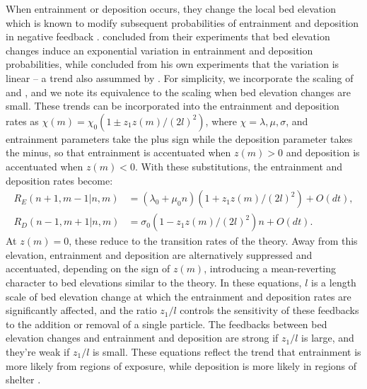 \documentclass[draft]{agujournal2018}
\begin{document}
When entrainment or deposition occurs, they change the local bed elevation which is known to modify subsequent probabilities of entrainment and deposition in negative feedback \citep{Sawai1987, Wong2007}.
\citet{Wong2007} concluded from their experiments that bed elevation changes induce an exponential variation in entrainment and deposition probabilities, while \citet{Sawai1987} concluded from his own experiments that the variation is linear -- a trend also assummed by \citet{Martin2014}.
For simplicity, we incorporate the scaling of \citet{Sawai1987} and \citet{Martin2014}, and we note its equivalence to the \citet{Wong2007} scaling when bed elevation changes are small.
These trends can be incorporated into the entrainment and deposition rates as $\chi(m) = \chi_0(1\pm z_1 z(m)/(2l)^2)$, where $\chi = \lambda, \mu, \sigma$, and entrainment parameters take the plus sign while the deposition parameter takes the minus, so that entrainment is accentuated when $z(m)>0$ and deposition is accentuated when $z(m)<0$. 
With these substitutions, the entrainment and deposition rates become:
\begin{align}
R_E(n+1,m-1| n,m)  &= (\lambda_0 + \mu_0 n)(1 + z_1z(m)/(2l)^2) + O(dt),\\
R_D(n-1,m+1| n,m) &= \sigma_0 (1-z_1z(m)/(2l)^2)n + O(dt).
\end{align} 
At $z(m)=0$, these reduce to the transition rates of the \citet{Ancey2008} theory.
Away from this elevation, entrainment and deposition are alternatively suppressed and accentuated, depending on the sign of $z(m)$, introducing a mean-reverting character to bed elevations similar to the \citet{Martin2014} theory. 
In these equations, $l$ is a length scale of bed elevation change at which the entrainment and deposition rates are significantly affected, and the ratio $z_1/l$ controls the sensitivity of these feedbacks to the addition or removal of a single particle.
The feedbacks between bed elevation changes and entrainment and deposition are strong if $z_1/l$ is large, and they're weak if $z_1/l$ is small.
These equations reflect the trend that entrainment is more likely from regions of exposure, while deposition is more likely in regions of shelter \citep[e.g.][]{Wong2007}.
\end{document}

